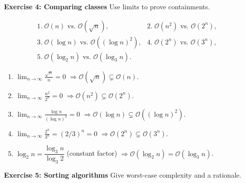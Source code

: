 \documentclass{article}
\theoremstyle{theorem}
\theoremstyle{definition}
\theoremstyle{remark}
\begin{document}
\bigskip
\textbf{Exercise 4: Comparing classes}
Use limits to prove containments.

\[
\begin{array}{ll}
1.\;\mathcal O(n)\text{ vs. }\mathcal O(\sqrt n),&
2.\;\mathcal O(n^{2})\text{ vs. }\mathcal O(2^{n}),\\[4pt]
3.\;\mathcal O(\log n)\text{ vs. }\mathcal O((\log n)^{2}),&
4.\;\mathcal O(2^{n})\text{ vs. }\mathcal O(3^{n}),\\[4pt]
5.\;\mathcal O(\log_{2}n)\text{ vs. }\mathcal O(\log_{3}n).
\end{array}
\]

\begin{enumerate}
  \item $\displaystyle\lim_{n\to\infty}\frac{\sqrt n}{n}=0$  
        $\Rightarrow\mathcal O(\sqrt n)\subsetneq\mathcal O(n)$.

  \item $\displaystyle\lim_{n\to\infty}\frac{n^{2}}{2^{n}}=0$  
        $\Rightarrow\mathcal O(n^{2})\subsetneq\mathcal O(2^{n})$.

  \item $\displaystyle\lim_{n\to\infty}\frac{\log n}{(\log n)^{2}}=0$  
        $\Rightarrow\mathcal O(\log n)\subsetneq\mathcal O((\log n)^{2})$.

  \item $\displaystyle\lim_{n\to\infty}\frac{2^{n}}{3^{n}}=(2/3)^{n}=0$  
        $\Rightarrow\mathcal O(2^{n})\subsetneq\mathcal O(3^{n})$.

  \item $\log_{2}n=\dfrac{\log_{3}n}{\log_{3}2}$ (constant factor)   
        $\Rightarrow\mathcal O(\log_{2}n)=\mathcal O(\log_{3}n)$.
\end{enumerate}


\bigskip
\textbf{Exercise 5: Sorting algorithms}
Give worst-case complexity and a rationale.
\end{document}
